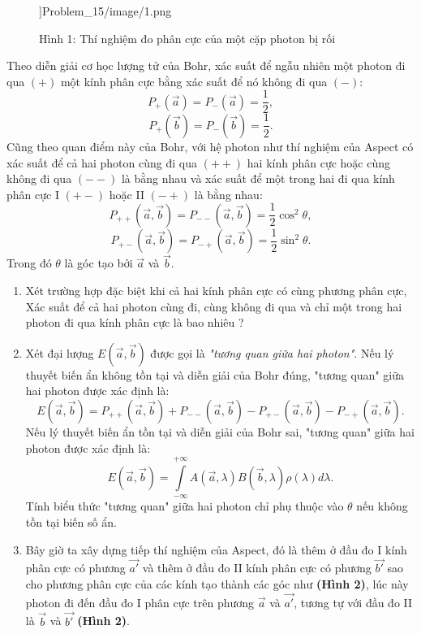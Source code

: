 \begin{enumerate}
\begin{center}
\begin{figure}[htp]
\begin{center}
        ]{Problem_15/image/1.png}
    \end{center}
    \begin{center}
    Hình 1: Thí nghiệm đo phân cực của một cặp photon bị rối
    \end{center}
    \end{figure}
\end{center}
Theo diễn giải cơ học lượng tử của Bohr, xác suất để ngẫu nhiên một photon đi qua $(+)$ một kính phân cực bằng xác suất để nó không đi qua $(-)$: $$P_+(\Vec{a})=P_-(\Vec{a})=\dfrac{1}{2},$$ $$P_+(\Vec{b})=P_-(\Vec{b})=\dfrac{1}{2}.$$
Cũng theo quan điểm này của Bohr, với hệ photon như thí nghiệm của Aspect có xác suất để cả hai photon cùng đi qua $(++)$ hai kính phân cực hoặc cùng không đi qua $(--)$ là bằng nhau và xác suất để một trong hai đi qua kính phân cực I $(+-)$ hoặc II $(-+)$ là bằng nhau: $$P_{++}(\Vec{a},\Vec{b})=P_{--}(\Vec{a},\Vec{b})=\dfrac{1}{2}\cos^2\theta,$$
$$P_{+-}(\Vec{a},\Vec{b})=P_{-+}(\Vec{a},\Vec{b})=\dfrac{1}{2}\sin^2\theta.$$
Trong đó $\theta$ là góc tạo bởi $\Vec{a}$ và $\Vec{b}$.
\begin{enumerate}[label=\textbf{\alph*,}]\itemsep0em
    \item Xét trường hợp đặc biệt khi cả hai kính phân cực có cùng phương phân cực, Xác suất để cả hai photon cùng đi, cùng không đi qua và chỉ một trong hai photon đi qua kính phân cực là bao nhiêu ?
    \item Xét đại lượng $E(\Vec{a},\Vec{b})$ được gọi là \textit{"tương quan giữa hai photon"}. Nếu lý thuyết biến ẩn không tồn tại và diễn giải của Bohr đúng, "tương quan" giữa hai photon được xác định là: $$E(\Vec{a},\Vec{b})=P_{++}(\Vec{a},\Vec{b})+P_{--}(\Vec{a},\Vec{b})-P_{+-}(\Vec{a},\Vec{b})-P_{-+}(\Vec{a},\Vec{b}).$$
Nếu lý thuyết biến ẩn tồn tại và diễn giải của Bohr sai, "tương quan" giữa hai photon được xác định là:
$$E(\Vec{a},\Vec{b})=\displaystyle\int\limits_{-\infty}^{+\infty}A(\Vec{a},\lambda)B(\Vec{b},\lambda)\rho(\lambda)d\lambda.$$ Tính biểu thức "tương quan" giữa hai photon chỉ phụ thuộc vào $\theta$ nếu không tồn tại biến số ẩn.
    \item Bây giờ ta xây dựng tiếp thí nghiệm của Aspect, đó là thêm ở đầu đo I kính phân cực có phương $\Vec{a'}$ và thêm ở đầu đo II kính phân cực có phương $\Vec{b'}$ sao cho phương phân cực của các kính tạo thành các góc như \textbf{(Hình 2)}, lúc này photon đi đến đầu đo I phân cực trên phương $\Vec{a}$ và $\Vec{a'}$, tương tự với đầu đo II là $\Vec{b}$ và $\Vec{b'}$ \textbf{(Hình 2)}.
    \begin{center}

\end{center}
\end{enumerate}
\end{enumerate}
